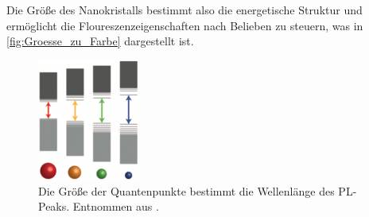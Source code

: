     Die Größe des Nanokristalls bestimmt also die energetische Struktur und ermöglicht die Floureszenzeigenschaften nach Belieben zu steuern, was in \autoref{fig:Groesse_zu_Farbe} dargestellt ist.
    \begin{figure}[ht]
        \centering\captionsetup{format=plain}
        \includegraphics[width=0.3\textwidth]{bilder/Groesse_zu_Farbe.png}
        \caption{Die Größe der Quantenpunkte bestimmt die Wellenlänge des PL-Peaks. Entnommen aus \cite{Farben}.}
        \label{fig:Groesse_zu_Farbe}
    \end{figure}





